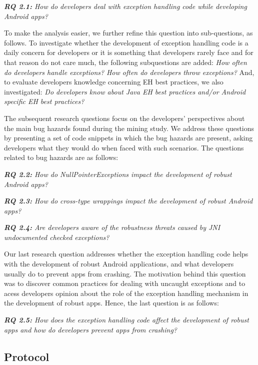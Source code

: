 {\emph{\textbf{RQ 2.1:} How do developers deal with exception handling code while developing Android apps?}

To make the analysis easier, we further refine this question into sub-questions, as follows. To investigate whether the development of exception handling code is a daily concern for developers or it is something that developers rarely face and for that reason do not care much, the following subquestions are added: \emph{How often do developers handle exceptions?} \emph{How often do developers throw exceptions?} And, to evaluate developers knowledge concerning EH best practices, we also investigated: \emph{Do developers know about Java EH best practices and/or Android specific EH best practices?}

The subsequent research questions focus on the developers' perspectives about the main bug hazards found during the mining study. We address these questions by presenting a set of code snippets in which the bug hazards are present, asking developers what they would do when faced with such scenarios. The questions related to bug hazards are as follows:

\emph{\textbf{RQ 2.2:} How do NullPointerExceptions impact the development of robust Android apps?}

\emph{\textbf{RQ 2.3:} How do cross-type wrappings impact the development of robust Android apps?}

\emph{\textbf{RQ 2.4:} Are developers aware of the robustness threats caused by JNI undocumented checked exceptions?}

Our last research question addresses whether the exception handling code helps with the development of robust Android applications, and what developers usually do to prevent apps from crashing. The motivation behind this question was to discover common practices for dealing with uncaught exceptions and to acess developers opinion about the role of the exception handling mechanism in the development of robust apps. Hence, the last question is as follows:

\emph{\textbf{RQ 2.5:} How does the exception handling code affect the development of robust apps and how do developers prevent apps from crashing?}

\subsection{Protocol}


}
